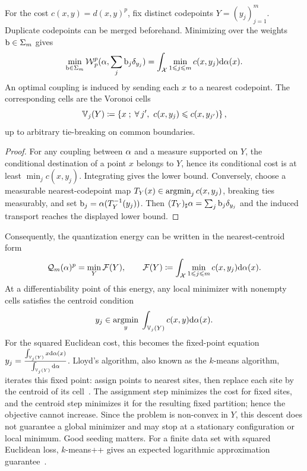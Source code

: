 \begin{prop}\label{prop-free-masses-voronoi}
	For the cost $c(x,y)=d(x,y)^p$, fix distinct codepoints $Y=(y_j)_{j=1}^m$. Duplicate codepoints can be merged beforehand. Minimizing over the weights $\mathrm{b}\in\Sigma_m$ gives
	\[
		\min_{\mathrm{b}\in\Sigma_m}
		\operatorname{\mathcal{W}}_p^p(\alpha,\sum_j \mathrm{b}_j\delta_{y_j})
		=
		\int_{\mathcal{X}} \min_{1\leqslant j\leqslant m} c(x,y_j)\mathrm{d}\alpha(x).
	\]
	An optimal coupling is induced by sending each $x$ to a nearest codepoint. The corresponding cells are the Voronoi cells
	\[
		\mathbb{V}_j(Y)
		\coloneqq
		\left\{ x \;;\; \forall \, j',\ c(x,y_j)\leqslant c(x,y_{j'}) \right\},
	\]
	up to arbitrary tie-breaking on common boundaries.
\end{prop}
\begin{proof}
	For any coupling between $\alpha$ and a measure supported on $Y$, the conditional destination of a point $x$ belongs to $Y$, hence its conditional cost is at least $\min_j c(x,y_j)$. Integrating gives the lower bound. Conversely, choose a measurable nearest-codepoint map $T_Y(x)\in\operatorname{argmin}_j c(x,y_j)$, breaking ties measurably, and set $\mathrm{b}_j=\alpha(T_Y^{-1}(y_j))$. Then $(T_Y)_\sharp\alpha=\sum_j \mathrm{b}_j\delta_{y_j}$ and the induced transport reaches the displayed lower bound.
\end{proof}

Consequently, the quantization energy can be written in the nearest-centroid form
\[
	\mathcal{Q}_m(\alpha)^p
	=
	\min_Y \mathcal{F}(Y),
	\qquad
	\mathcal{F}(Y)
	\coloneqq
	\int_{\mathcal{X}} \min_{1\leqslant j\leqslant m} c(x,y_j)\mathrm{d}\alpha(x).
\]
At a differentiability point of this energy, any local minimizer with nonempty cells satisfies the centroid condition
\[
	y_j
	\in
	\underset{y}{\operatorname{argmin}}\;
	\int_{\mathbb{V}_j(Y)} c(x,y)\mathrm{d}\alpha(x).
\]
For the squared Euclidean cost, this becomes the fixed-point equation $y_j=\frac{\int_{\mathbb{V}_j(Y)} x\mathrm{d}\alpha(x)}{\int_{\mathbb{V}_j(Y)} \mathrm{d}\alpha}$.
Lloyd's algorithm, also known as the $k$-means algorithm, iterates this fixed point: assign points to nearest sites, then replace each site by the centroid of its cell~\cite{Lloyd82}. The assignment step minimizes the cost for fixed sites, and the centroid step minimizes it for the resulting fixed partition; hence the objective cannot increase. Since the problem is non-convex in $Y$, this descent does not guarantee a global minimizer and may stop at a stationary configuration or local minimum. Good seeding matters. For a finite data set with squared Euclidean loss, $k$-means++ gives an expected logarithmic approximation guarantee~\cite{ArthurVassilvitskii2007}.

